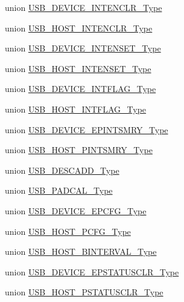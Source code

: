 \begin{DoxyCompactItemize}
union \hyperlink{union_u_s_b___d_e_v_i_c_e___i_n_t_e_n_c_l_r___type}{U\+S\+B\+\_\+\+D\+E\+V\+I\+C\+E\+\_\+\+I\+N\+T\+E\+N\+C\+L\+R\+\_\+\+Type}
\item 
union \hyperlink{union_u_s_b___h_o_s_t___i_n_t_e_n_c_l_r___type}{U\+S\+B\+\_\+\+H\+O\+S\+T\+\_\+\+I\+N\+T\+E\+N\+C\+L\+R\+\_\+\+Type}
\item 
union \hyperlink{union_u_s_b___d_e_v_i_c_e___i_n_t_e_n_s_e_t___type}{U\+S\+B\+\_\+\+D\+E\+V\+I\+C\+E\+\_\+\+I\+N\+T\+E\+N\+S\+E\+T\+\_\+\+Type}
\item 
union \hyperlink{union_u_s_b___h_o_s_t___i_n_t_e_n_s_e_t___type}{U\+S\+B\+\_\+\+H\+O\+S\+T\+\_\+\+I\+N\+T\+E\+N\+S\+E\+T\+\_\+\+Type}
\item 
union \hyperlink{union_u_s_b___d_e_v_i_c_e___i_n_t_f_l_a_g___type}{U\+S\+B\+\_\+\+D\+E\+V\+I\+C\+E\+\_\+\+I\+N\+T\+F\+L\+A\+G\+\_\+\+Type}
\item 
union \hyperlink{union_u_s_b___h_o_s_t___i_n_t_f_l_a_g___type}{U\+S\+B\+\_\+\+H\+O\+S\+T\+\_\+\+I\+N\+T\+F\+L\+A\+G\+\_\+\+Type}
\item 
union \hyperlink{union_u_s_b___d_e_v_i_c_e___e_p_i_n_t_s_m_r_y___type}{U\+S\+B\+\_\+\+D\+E\+V\+I\+C\+E\+\_\+\+E\+P\+I\+N\+T\+S\+M\+R\+Y\+\_\+\+Type}
\item 
union \hyperlink{union_u_s_b___h_o_s_t___p_i_n_t_s_m_r_y___type}{U\+S\+B\+\_\+\+H\+O\+S\+T\+\_\+\+P\+I\+N\+T\+S\+M\+R\+Y\+\_\+\+Type}
\item 
union \hyperlink{union_u_s_b___d_e_s_c_a_d_d___type}{U\+S\+B\+\_\+\+D\+E\+S\+C\+A\+D\+D\+\_\+\+Type}
\item 
union \hyperlink{union_u_s_b___p_a_d_c_a_l___type}{U\+S\+B\+\_\+\+P\+A\+D\+C\+A\+L\+\_\+\+Type}
\item 
union \hyperlink{union_u_s_b___d_e_v_i_c_e___e_p_c_f_g___type}{U\+S\+B\+\_\+\+D\+E\+V\+I\+C\+E\+\_\+\+E\+P\+C\+F\+G\+\_\+\+Type}
\item 
union \hyperlink{union_u_s_b___h_o_s_t___p_c_f_g___type}{U\+S\+B\+\_\+\+H\+O\+S\+T\+\_\+\+P\+C\+F\+G\+\_\+\+Type}
\item 
union \hyperlink{union_u_s_b___h_o_s_t___b_i_n_t_e_r_v_a_l___type}{U\+S\+B\+\_\+\+H\+O\+S\+T\+\_\+\+B\+I\+N\+T\+E\+R\+V\+A\+L\+\_\+\+Type}
\item 
union \hyperlink{union_u_s_b___d_e_v_i_c_e___e_p_s_t_a_t_u_s_c_l_r___type}{U\+S\+B\+\_\+\+D\+E\+V\+I\+C\+E\+\_\+\+E\+P\+S\+T\+A\+T\+U\+S\+C\+L\+R\+\_\+\+Type}
\item 
union \hyperlink{union_u_s_b___h_o_s_t___p_s_t_a_t_u_s_c_l_r___type}{U\+S\+B\+\_\+\+H\+O\+S\+T\+\_\+\+P\+S\+T\+A\+T\+U\+S\+C\+L\+R\+\_\+\+Type}

\end{DoxyCompactItemize}
